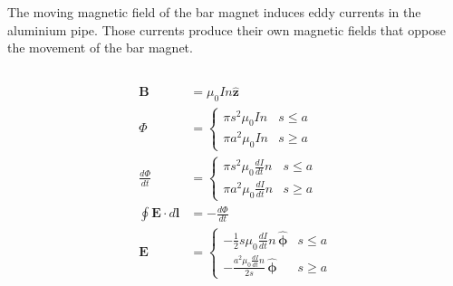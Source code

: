 \documentclass{article}
\renewcommand{\vec}[1]{\boldsymbol{\mathbf{#1}}}
\newcommand{\uvec}[1]{\hat{\vec{#1}}}
\begin{document}
The moving magnetic field of the bar magnet induces eddy currents in the aluminium pipe. Those currents produce their own magnetic fields that oppose the movement of the bar magnet.

\subsection{}

\begin{align*}
  \vec{B}                       & = \mu_0 I n \uvec{z}                                                      \\
  \Phi                          & = \begin{cases}
                                      \pi s^2 \mu_0 I n & s \le a \\
                                      \pi a^2 \mu_0 I n & s \ge a
                                    \end{cases}                                             \\
  \frac{d \Phi}{d t}            & = \begin{cases}
                                      \pi s^2 \mu_0 \frac{d I}{d t} n & s \le a \\
                                      \pi a^2 \mu_0 \frac{d I}{d t} n & s \ge a
                                    \end{cases}                               \\
  \oint \vec{E} \cdot d \vec{l} & = -\frac{d \Phi}{d t}                                                     \\
  \vec{E}                       & = \begin{cases}
                                      -\frac{1}{2} s \mu_0 \frac{d I}{d t} n \,\uvec{\phi}   & s \le a \\
                                      -\frac{a^2 \mu_0 \frac{d I}{d t} n}{2 s} \,\uvec{\phi} & s \ge a
                                    \end{cases}
\end{align*}

\subsection{}
\end{document}
